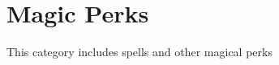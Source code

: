 \chapter{Magic Perks}\label{ch:magicPerks}
This category includes spells and other magical perks

	
	
	